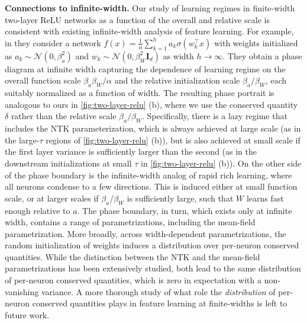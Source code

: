 \documentclass{article}
\theoremstyle{plain}
\theoremstyle{definition}
\theoremstyle{remark}
\begin{document}
\textbf{Connections to infinite-width.} Our study of learning regimes in finite-width two-layer ReLU networks as a function of the overall and relative scale is consistent with existing infinite-width analysis of feature learning. For example, in \citet{luo2021phase} they consider a network $f(x) = \frac{1}{\alpha}\sum_{k = 1}^ha_k\sigma(w_k^\intercal x)$ with weights initialized as $a_k \sim \mathcal{N}(0, \beta_a^2)$ and $w_k \sim \mathcal{N}(0, \beta_W^2\mathbf{I}_d)$ as width $h\to\infty$. They obtain a phase diagram at infinite width capturing the dependence of learning regime on the overall function scale $\beta_a\beta_W/\alpha$ and the relative initialization scale $\beta_a/\beta_W$, each suitably normalized as a function of width. The resulting phase portrait is analogous to ours in \cref{fig:two-layer-relu} (b), where we use the conserved quantity $\delta$ rather than the relative scale $\beta_a/\beta_W$. Specifically, there is a lazy regime that includes the NTK parameterization, which is always achieved at large scale (as in the large-$\tau$ regions of \cref{fig:two-layer-relu} (b)), but is also achieved at small scale if the first layer variance is sufficiently larger than the second (as in the downstream initializations at small $\tau$ in \cref{fig:two-layer-relu} (b)). On the other side of the phase boundary is the infinite-width analog of rapid rich learning, where all neurons condense to a few directions. This is induced either at small function scale, or at larger scales if $\beta_a/\beta_W$ is sufficiently large, such that $W$ learns fast enough relative to $a$. The phase boundary, in turn, which exists only at infinite width, contains a range of parametrizations, including the mean-field parametrization.
%
More broadly, across width-dependent parametrizations, the random initialization of weights induces a distribution over per-neuron conserved quantities. 
%
While the distinction between the NTK and the mean-field parametrizations has been extensively studied, both lead to the same distribution of per-neuron conserved quantities, which is zero in expectation with a non-vanishing variance.
%
A more thorough study of what role the \textit{distribution} of per-neuron conserved quantities plays in feature learning at finite-widths is left to future work.
\end{document}
